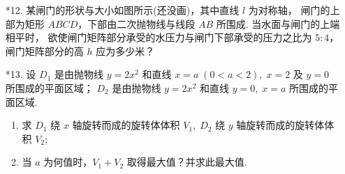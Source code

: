 \begin{enumerate}
    \item[*12.] 某闸门的形状与大小如图所示(还没画)，其中直线 $l$ 为对称轴，
    闸门的上部为矩形 $ABCD$，下部由二次抛物线与线段 $AB$ 所围成. 当水面与闸门的上端相平时，
    欲使闸门矩阵部分承受的水压力与闸门下部承受的压力之比为 $5:4$，闸门矩阵部分的高 $h$ 应为多少米？

    \item[*13.] 设 $D_1$ 是由抛物线 $y=2x^2$ 和直线 $x=a\;(0<a<2),\;x=2$ 及 $y=0$ 所围成的平面区域；
    $D_2$ 是由抛物线 $y=2x^2$ 和直线 $y=0,\;x=a$ 所围成的平面区域.
    \begin{enumerate}[(1)]\setlength{\itemsep}{5pt}\setlength{\topsep}{15pt}
        \item 求 $D_1$ 绕 $x$ 轴旋转而成的旋转体体积 $V_1,\;D_2$ 绕 $y$ 轴旋转而成的旋转体体积 $V_2$;
        \item 当 $a$ 为何值时，$V_1+V_2$ 取得最大值？并求此最大值.
    \end{enumerate}   

\end{enumerate}